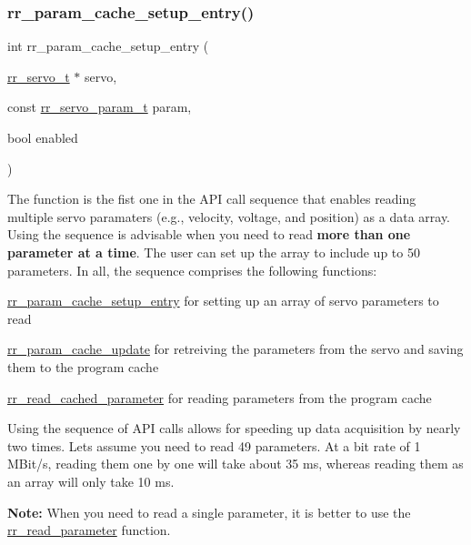 \subsubsection{\texorpdfstring{rr\+\_\+param\+\_\+cache\+\_\+setup\+\_\+entry()}{rr\_param\_cache\_setup\_entry()}}
{\footnotesize\ttfamily int rr\+\_\+param\+\_\+cache\+\_\+setup\+\_\+entry (\begin{DoxyParamCaption}\item[{\hyperlink{structrr__servo__t}{rr\+\_\+servo\+\_\+t} $\ast$}]{servo,  }\item[{const \hyperlink{api_8h_aa1f58887fab4642cf49f6f453c1d276d}{rr\+\_\+servo\+\_\+param\+\_\+t}}]{param,  }\item[{bool}]{enabled }\end{DoxyParamCaption})}



The function is the fist one in the A\+PI call sequence that enables reading multiple servo paramaters (e.\+g., velocity, voltage, and position) as a data array. Using the sequence is advisable when you need to read {\bfseries more than one parameter at a time}. The user can set up the array to include up to 50 parameters. In all, the sequence comprises the following functions\+: 


\begin{DoxyItemize}
\item \hyperlink{group___servo__info_ga770c1e8b4d868cea649592e26a2706dd}{rr\+\_\+param\+\_\+cache\+\_\+setup\+\_\+entry} for setting up an array of servo parameters to read 
\item \hyperlink{group___servo__info_ga4d9f2bcfc136357405359c9ca9d4aedf}{rr\+\_\+param\+\_\+cache\+\_\+update} for retreiving the parameters from the servo and saving them to the program cache 
\item \hyperlink{group___servo__info_ga9249202a29031f84b7dc3da37db05dfc}{rr\+\_\+read\+\_\+cached\+\_\+parameter} for reading parameters from the program cache
\end{DoxyItemize}Using the sequence of A\+PI calls allows for speeding up data acquisition by nearly two times. Let\textquotesingle{}s assume you need to read 49 parameters. At a bit rate of 1 M\+Bit/s, reading them one by one will take about 35 ms, whereas reading them as an array will only take 10 ms. 

{\bfseries Note\+:} When you need to read a single parameter, it is better to use the \hyperlink{group___servo__info_gae665cf9423955f882e94282d66ba6a60}{rr\+\_\+read\+\_\+parameter} function.


